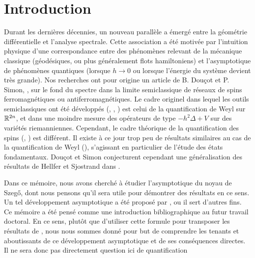 \chapter*{Introduction}
Durant les dernières décennies, un nouveau parallèle a émergé entre la géométrie différentielle et l'analyse spectrale. Cette association a été motivée par l'intuition physique d'une correspondance entre des phénomènes relevant de la mécanique classique (géodésiques, ou plus généralement flots hamiltoniens) et l'asymptotique de phénomènes quantiques (lorsque $h \to 0$ ou lorsque l'énergie du système devient très grande). Nos recherches ont pour origine un article de B. Douçot et P. Simon, \cite{douccot1998semiclassical}, sur le fond du spectre dans la limite semiclassique de réseaux de spins ferromagnétiques ou antiferromagnétiques. Le cadre originel dans lequel les outils semiclassiques ont été développés (\cite{hellfer1988semi}, \cite{brummelhuis1991}, \cite{zworski2012semiclassical}) est celui de la quantification de Weyl sur $\mathbb{R}^{2n}$, et dans une moindre mesure des opérateurs de type $-h^2\Delta + V$ sur des variétés riemanniennes. Cependant, le cadre théorique de la quantification des spins (\cite{ma2012berezin}, \cite{borthwick2000introduction}) est différent. Il existe à ce jour trop peu de résultats similaires au cas de la quantification de Weyl (\cite{borthwick1998semiclassical}), s'agissant en particulier de l'étude des états fondamentaux. Douçot et Simon conjecturent cependant une généralisation des résultats de Hellfer et Sjostrand dans \cite{helffer1988semi}. 

Dans ce mémoire, nous avons cherché à étudier l'asymptotique du noyau de Szeg\H{o}, dont nous pensons qu'il sera utile pour démontrer des résultats en ce sens. Un tel développement asymptotique a été proposé par \cite{Shiffman2002}, ou il sert d'autres fins. Ce mémoire a été pensé comme une introduction bibliographique au futur travail doctoral. En ce sens, plutôt que d'utiliser cette formule pour transposer les résultats de \cite{helffer1988semi}, nous nous sommes donné pour but de comprendre les tenants et aboutissants de ce développement asymptotique et de ses conséquences directes. Il ne sera donc pas directement question ici de quantification